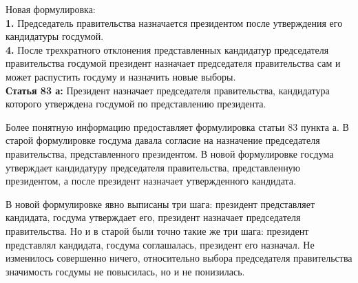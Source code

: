 \documentclass[a4paper, 12pt]{article}
\begin{document}
Новая формулировка: \\
\textbf{1.} Председатель правительства назначается президентом после утверждения его кандидатуры госдумой. \\
\textbf{4.} После трехкратного отклонения представленных кандидатур председателя правительства госдумой президент назначает председателя правительства сам и может распустить госдуму и назначить новые выборы. \\
\textbf{Статья 83 а:} Президент назначает председателя правительства, кандидатура которого утверждена госдумой по представлению президента.

Более понятную информацию предоставляет формулировка статьи 83 пункта а. 
В старой формулировке госдума давала согласие на назначение председателя правительства, представленного президентом. 
В новой формулировке госдума утверждает кандидатуру председателя правительства, представленную президентом, а после президент назначает утвержденного кандидата. 

В новой формулировке явно выписаны три шага: президент представляет кандидата, госдума утверждает его, президент назначает председателя правительства. Но и в старой были точно такие же три шага: президент представлял кандидата, госдума соглашалась, президент его назначал. Не изменилось совершенно ничего, относительно выбора председателя правительства значимость госдумы не повысилась, но и не понизилась. 
\end{document}
